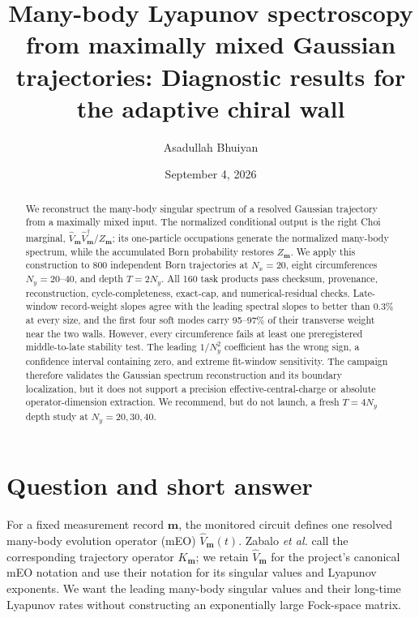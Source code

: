 \documentclass[aps,prb,twocolumn,floatfix,nofootinbib,superscriptaddress]{revtex4-2}
\begin{document}
\title{Many-body Lyapunov spectroscopy from maximally mixed Gaussian trajectories: Diagnostic results for the adaptive chiral wall}

\author{Asadullah Bhuiyan}
\date{September 4, 2026}

\begin{abstract}
We reconstruct the many-body singular spectrum of a resolved Gaussian trajectory from a maximally mixed input.  The normalized conditional output is the right Choi marginal, \(\hat V_{\boldsymbol m}\hat V_{\boldsymbol m}^{\dagger}/Z_{\boldsymbol m}\); its one-particle occupations generate the normalized many-body spectrum, while the accumulated Born probability restores \(Z_{\boldsymbol m}\).  We apply this construction to 800 independent Born trajectories at \(N_x=20\), eight circumferences \(N_y=20\)--40, and depth \(T=2N_y\).  All 160 task products pass checksum, provenance, reconstruction, cycle-completeness, exact-cap, and numerical-residual checks.  Late-window record-weight slopes agree with the leading spectral slopes to better than 0.3\% at every size, and the first four soft modes carry 95--97\% of their transverse weight near the two walls.  However, every circumference fails at least one preregistered middle-to-late stability test.  The leading \(1/N_y^2\) coefficient has the wrong sign, a confidence interval containing zero, and extreme fit-window sensitivity.  The campaign therefore validates the Gaussian spectrum reconstruction and its boundary localization, but it does not support a precision effective-central-charge or absolute operator-dimension extraction.  We recommend, but do not launch, a fresh \(T=4N_y\) depth study at \(N_y=20,30,40\).
\end{abstract}

\maketitle
\setcounter{tocdepth}{2}
\tableofcontents

\section{Question and short answer}

For a fixed measurement record \(\boldsymbol m\), the monitored circuit defines one resolved many-body evolution operator (mEO) \(\hat V_{\boldsymbol m}(t)\).  Zabalo \emph{et al.} call the corresponding trajectory operator \(K_{\boldsymbol m}\); we retain \(\hat V_{\boldsymbol m}\) for the project's canonical mEO notation and use their notation for its singular values and Lyapunov exponents.  We want the leading many-body singular values and their long-time Lyapunov rates without constructing an exponentially large Fock-space matrix.
\end{document}
